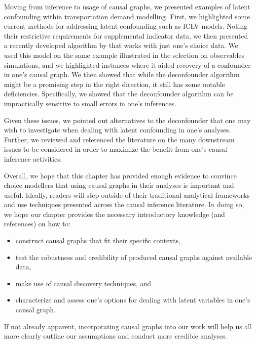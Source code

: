 Moving from inference to usage of causal graphs, we presented examples of latent confounding within transportation demand modelling.
First, we highlighted some current methods for addressing latent confounding such as ICLV models.
Noting their restrictive requirements for supplemental indicator data,
we then presented a recently developed algorithm by \citet{wang_2019_blessings}
that works with just one's choice data.
We used this model on the same example illustrated in the selection on observables simulations,
and we highlighted instances where it aided recovery of a confounder in one's causal graph.
We then showed that while the deconfounder algorithm might be a promising step in the right direction,
it still has some notable deficiencies.
Specifically, we showed that the deconfounder algorithm can be impractically sensitive to small errors in one's inferences.

Given these issues, we pointed out alternatives to the deconfounder that one may wish to investigate when dealing with latent confounding in one's analyses.
Further, we reviewed and referenced the literature on the many downstream issues to be considered in order to maximize the benefit from one's causal inference activities.

Overall, we hope that this chapter has provided enough evidence to convince choice modellers that using causal graphs in their analyses is important and useful.
Ideally, readers will step outside of their traditional analytical frameworks and use techniques presented across the causal inference literature.
In doing so, we hope our chapter provides the necessary introductory knowledge (and references) on how to:
\begin{itemize}
    \item construct causal graphs that fit their specific contexts,
    \item test the robustness and credibility of produced causal graphs against available data,
    \item make use of causal discovery techniques, and
    \item characterize and assess one's options for dealing with latent variables in one's causal graph.
\end{itemize}
If not already apparent, incorporating causal graphs into our work will help us all more clearly outline our assumptions and conduct more credible analyses.
